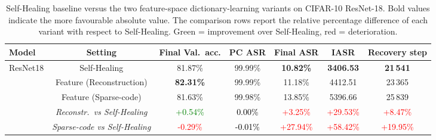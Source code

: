 \begin{table}[H]
\centering
\begin{threeparttable}
\caption{Self-Healing baseline versus the two feature-space dictionary-learning variants on CIFAR-10 ResNet-18.
Bold values indicate the more favourable absolute value.
The comparison rows report the relative percentage difference of each variant with respect to Self-Healing.
Green = improvement over Self-Healing, red = deterioration.}
\label{tab:summary_cifar10_resnet18_defense_vs_feature}
\renewcommand{\arraystretch}{0.90}
\setlength{\tabcolsep}{4pt}
\footnotesize
\begin{tabular}{lcccccc}
\toprule
\textbf{Model} & \textbf{Setting} & \textbf{Final Val.\ acc.} & \textbf{PC ASR} & \textbf{Final ASR} & \textbf{IASR} & \textbf{Recovery step} \\
\midrule
\multirow{5}{*}{ResNet18}
& Self-Healing & 81.87\% & 99.99\% & \textbf{10.82\%} & \textbf{3406.53} & \textbf{21\,541} \\
& Feature (Reconstruction) & \textbf{82.31\%} & 99.99\% & 11.18\% & 4412.51 & 23\,365 \\
& Feature (Sparse-code) & 81.63\% & 99.98\% & 13.85\% & 5396.66 & 25\,839 \\
\cmidrule(lr){2-7}
& \textit{Reconstr.\ vs Self-Healing} & \textcolor{green}{+0.54\%} & \textcolor{black}{0.00\%} & \textcolor{red}{+3.25\%} & \textcolor{red}{+29.53\%} & \textcolor{red}{+8.47\%} \\
& \textit{Sparse-code vs Self-Healing} & \textcolor{red}{-0.29\%} & \textcolor{black}{-0.01\%} & \textcolor{red}{+27.94\%} & \textcolor{red}{+58.42\%} & \textcolor{red}{+19.95\%} \\
\bottomrule
\end{tabular}
\end{threeparttable}
\end{table}